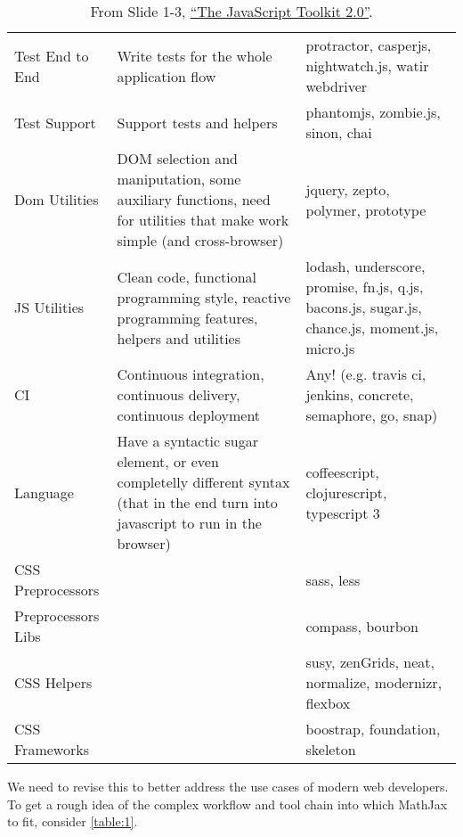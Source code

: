 \documentclass[]{amsart}
\begin{document}
\begin{table}
\begin{center}
\begin{tabularx}{\textwidth}{p{2cm} p{5cm} p{5cm}}
    Test End to End & 
    Write tests for the whole application ﬂow & 
    protractor, casperjs, nightwatch.js, watir webdriver \\
  
    Test Support & 
    Support tests and helpers & 
    phantomjs, zombie.js, sinon, chai \\
  
    Dom Utilities & 
    DOM selection and maniputation, some auxiliary functions, need for utilities that make work simple (and cross-browser) & 
    jquery, zepto, polymer, prototype \\
  
    JS Utilities & 
    Clean code, functional programming style, reactive programming features, helpers and utilities & 
    lodash, underscore, promise, fn.js, q.js, bacons.js, sugar.js, chance.js, moment.js, micro.js \\
  
    CI & 
    Continuous integration, continuous delivery, continuous deployment & 
    Any! (e.g. travis ci, jenkins, concrete, semaphore, go, snap) \\
  
    Language & 
    Have a syntactic sugar element, or even completelly diﬀerent syntax (that in the end turn into javascript to run in the browser) & 
    coﬀeescript, clojurescript, typescript 3 \\
  
    CSS Preprocessors & 
     & 
    sass, less \\
  
    Preprocessors Libs & 
     & 
    compass, bourbon \\
  
    CSS Helpers & 
     & 
    susy, zenGrids, neat, normalize, modernizr, ﬂexbox \\
  
    CSS Frameworks & 
     & 
    boostrap, foundation, skeleton

  \end{tabularx}
  \caption[]{From Slide 1-3, \href{http://www.slideshare.net/bymarkone/the-javascript-toolkit-20}{``The
JavaScript Toolkit 2.0''}.}
  \label{table:1}
\end{center}
\end{table}


We need to revise this to better address the use cases of modern web
developers. To get a rough idea of the complex workflow and tool chain
into which MathJax to fit, consider \autoref{table:1}.
\end{document}
